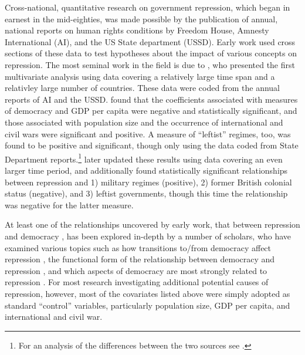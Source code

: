 \documentclass[12pt]{article}
\begin{document}
Cross-national, quantitative research on government repression, which began in earnest in the mid-eighties, was made possible by the publication of annual, national reports on human rights conditions by Freedom House, Amnesty International (AI), and the US State department (USSD). Early work used cross sections of these data to test hypotheses about the impact of various concepts on repression. The most seminal work in the field is due to \citet{PoeTate1994}, who presented the first multivariate analysis using data covering a relatively large time span and a relativley large number of countries. These data were coded from the annual reports of AI and the USSD. \citet{PoeTate1994} found that the coefficients associated with measures of democracy and GDP per capita were negative and statistically significant, and those associated with population size and the occurrence of international and civil wars were significant and positive. A measure of ``leftist'' regimes, too, was found to be positive and significant, though only using the data coded from State Department reports.\footnote{For an analysis of the differences between the two sources see \citet{Poe2001}.} \citet{Poeetal1999} later updated these results using data covering an even larger time period, and additionally found statistically significant relationships between repression and 1) military regimes (positive), 2) former British colonial status (negative), and 3) leftist governments, though this time the relationship was negative for the latter measure. 

At least one of the relationships uncovered by early work, that between repression and democracy \citep{Henderson1991,PoeTate1994}, has been explored in-depth by a number of scholars, who have examined various topics such as how transitions to/from democracy affect repression \citep{Davenport1999}, the functional form of the relationship between democracy and repression \citep{Fein1995,DavenportArmstrong2004}, and which aspects of democracy are most strongly related to repression \citep{BDMetal2005, Davenport2007}. For most research investigating additional potential causes of repression, however, most of the covariates listed above were simply adopted as standard ``control'' variables, particularly population size, GDP per capita, and international and civil war. 
\end{document}
